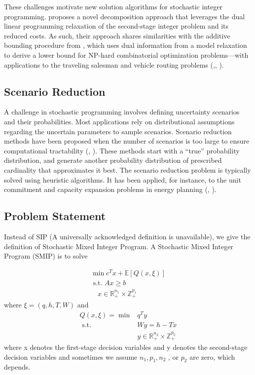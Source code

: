 \documentclass{article}
\theoremstyle{plain}
\theoremstyle{definition}
\begin{document}
These challenges motivate new solution algorithms for stochastic integer programming. \cite{Wang and  Jacquillat 2020} proposes a novel decomposition approach that leverages the dual linear programming relaxation of the second-stage integer problem and its reduced costs. As such, their approach shares similarities with the additive bounding procedure from \cite{Fischetti and Toth 1989}, which uses dual information from a model relaxation to derive a lower bound for NP-hard combinatorial optimization problems—with applications to the traveling salesman and vehicle routing problems (\cite{Fischetti and Toth 1992},\cite{ Baldacci et al. 2008}, \cite{Baldacci and Mingozzi 2009}).
\subsection{Scenario Reduction}
A challenge in stochastic programming involves defining uncertainty scenarios and their probabilities. Most applications rely on distributional assumptions regarding the uncertain parameters to sample scenarios. Scenario reduction methods have been proposed when the number of scenarios is too large to ensure computational tractability (\cite{Dupacova et al. 2003}, \cite{Romisch 2009}). These methods start with a “true” probability distribution, and generate another probability distribution of prescribed cardinality that approximates it best. The scenario reduction problem is typically solved using heuristic algorithms. It has been applied, for instance, to the unit commitment and capacity expansion problems in energy planning (\cite{Carrion et al. 2007}, \cite{Morales et al. 2009}). 
\subsection{Problem Statement} 
Instead of SIP (A universally acknowledged definition is unavailable), we give the definition of  Stochastic Mixed Integer Program. 
A Stochastic Mixed Integer Program (SMIP) is to solve 

\begin{equation}
\begin{array}{l}
\min c^{T} x+\mathbb{E}[Q(x, \xi)] \\
\text { s.t. } A x \geq b \\
\quad x \in \mathbb{R}_{+}^{n_{1}} \times \mathbb{Z}_{+}^{p_{1}}
\end{array}
\end{equation}
where  $\xi=(q, h, T, W)$  and
$$
\begin{aligned}
Q(x, \xi)=\min &  q^{T} y \\
\text { s.t. } & W y=h-T x \\
& y \in \mathbb{R}_{+}^{n_{2}} \times \mathbb{Z}_{+}^{p_{2}} 
\end{aligned}
$$
where x denotes the first-stage decision variables and  y  denotes the second-stage decision variables and sometimes we assume  $n_{1}, p_{1}, n_{2}$ , or  $p_{2}$  are zero, which depends.
\end{document}
